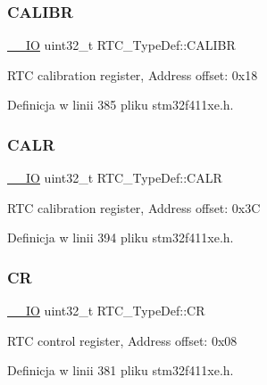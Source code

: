 \subsubsection{\texorpdfstring{C\+A\+L\+I\+BR}{CALIBR}}
{\footnotesize\ttfamily \hyperlink{core__sc300_8h_aec43007d9998a0a0e01faede4133d6be}{\+\_\+\+\_\+\+IO} uint32\+\_\+t R\+T\+C\+\_\+\+Type\+Def\+::\+C\+A\+L\+I\+BR}

R\+TC calibration register, Address offset\+: 0x18 

Definicja w linii 385 pliku stm32f411xe.\+h.

\mbox{\label{struct_r_t_c___type_def_aea66ea813830c2f3ff207464794397a4}} 
\subsubsection{\texorpdfstring{C\+A\+LR}{CALR}}
{\footnotesize\ttfamily \hyperlink{core__sc300_8h_aec43007d9998a0a0e01faede4133d6be}{\+\_\+\+\_\+\+IO} uint32\+\_\+t R\+T\+C\+\_\+\+Type\+Def\+::\+C\+A\+LR}

R\+TC calibration register, Address offset\+: 0x3C 

Definicja w linii 394 pliku stm32f411xe.\+h.

\mbox{\label{struct_r_t_c___type_def_a731d9209ce40dce6ea61fcc6f818c892}} 
\subsubsection{\texorpdfstring{CR}{CR}}
{\footnotesize\ttfamily \hyperlink{core__sc300_8h_aec43007d9998a0a0e01faede4133d6be}{\+\_\+\+\_\+\+IO} uint32\+\_\+t R\+T\+C\+\_\+\+Type\+Def\+::\+CR}

R\+TC control register, Address offset\+: 0x08 

Definicja w linii 381 pliku stm32f411xe.\+h.

\mbox{\label{struct_r_t_c___type_def_a8750eae683cb3d382476dc7cdcd92b96}} 
